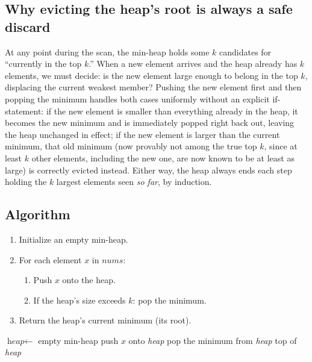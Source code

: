 \subsection*{Why evicting the heap's root is always a safe discard}

At any point during the scan, the min-heap holds some $k$ candidates for
``currently in the top $k$.'' When a new element arrives and the heap
already has $k$ elements, we must decide: is the new element large enough
to belong in the top $k$, displacing the current weakest member? Pushing
the new element first and then popping the minimum handles both cases
uniformly without an explicit if-statement: if the new element is smaller
than everything already in the heap, it becomes the new minimum and is
immediately popped right back out, leaving the heap unchanged in effect;
if the new element is larger than the current minimum, that old minimum
(now provably not among the true top $k$, since at least $k$ other
elements, including the new one, are now known to be at least as large)
is correctly evicted instead. Either way, the heap always ends each step
holding the $k$ largest elements seen \emph{so far}, by induction.

\subsection*{Algorithm}

\begin{enumerate}
  \item Initialize an empty min-heap.
  \item For each element $x$ in $\textit{nums}$:
  \begin{enumerate}
    \item Push $x$ onto the heap.
    \item If the heap's size exceeds $k$: pop the minimum.
  \end{enumerate}
  \item Return the heap's current minimum (its root).
\end{enumerate}

\begin{algorithm}[H]
\caption{Kth Largest Element}
\begin{algorithmic}[1]
  \State $\textit{heap} \gets$ empty min-heap
    \State push $x$ onto \textit{heap}
      \State pop the minimum from \textit{heap}
    \EndIf
  \EndFor
  \State \Return top of \textit{heap}
\EndProcedure
\end{algorithmic}
\end{algorithm}

